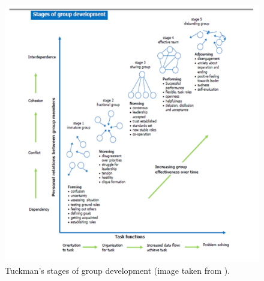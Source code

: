 \documentclass[12pt]{../notes}
\begin{document}
\begin{figure}
\includegraphics[width=\textwidth]{../figures/moduleD/group_stages.png}
\caption{Tuckman's stages of group development (image taken from \cite{cullen2015}).}
\label{fig:group_stage}
\end{figure}







\end{document}

